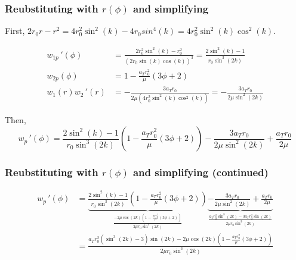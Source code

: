\documentclass{beamer}
\begin{document}
\begin{frame}
    \frametitle{Reubstituting with $r(\phi)$ and simplifying}

    First, $2r_0r-r^2=4r_0^2\sin^2(k)-4r_0sin^4(k)=4r_0^2\sin^2(k)\cos^2(k)$.

    {\begin{align}
        w_{1p}\,'(\phi)&=\frac{2r_0^2\sin^2(k)-r_0^2}{\left(2r_0\sin(k)\cos(k)\right)^3}=\frac{2\sin^2(k)-1}{r_0\sin^3(2k)}\\
        w_{2p}(\phi)&=1-\frac{a_Tr_0^2}{\mu}(3\phi+2)\\
        w_1(r)w_2\,'(r)&=-\frac{3a_Tr_0}{2\mu(4r_0^2\sin^2(k)\cos^2(k))}=-\frac{3a_Tr_0}{2\mu\sin^2(2k)}
    \end{align}}

    Then, 
    {\footnotesize\begin{equation}
        w_p\,'(\phi)=\frac{2\sin^2(k)-1}{r_0\sin^3(2k)}\left(1-\frac{a_Tr_0^2}{\mu}(3\phi+2)\right)-\frac{3a_Tr_0}{2\mu\sin^2(2k)}+\frac{a_Tr_0}{2\mu}
    \end{equation}}

\end{frame}

\begin{frame}
    \frametitle{Reubstituting with $r(\phi)$ and simplifying (continued)}

    {\footnotesize\begin{align}
        w_p\,'(\phi)&=\underbrace{\frac{2\sin^2(k)-1}{r_0\sin^3(2k)}\left(1-\frac{a_Tr_0^2}{\mu}(3\phi+2)\right)}_{\frac{-2\mu\cos(2k)\left(1-\frac{a_Tr_0^2}{\mu}(3\phi+2)\right)}{2\mu r_0\sin^3(2k)}}\underbrace{-\frac{3a_Tr_0}{2\mu\sin^2(2k)}+\frac{a_Tr_0}{2\mu}}_{\frac{a_Tr_0^2\sin^3(2k)-3a_Tr_0^2\sin(2k)}{2\mu r_0\sin^3(2k)}}\\
        &=\frac{a_Tr_0^2\left(\sin^3(2k)-3\right)\sin(2k)-2\mu\cos(2k)\left(1-\frac{a_Tr_0^2}{\mu}(3\phi+2)\right)}{2\mu r_0\sin^3(2k)}
    \end{align}}
\end{frame}
\end{document}
